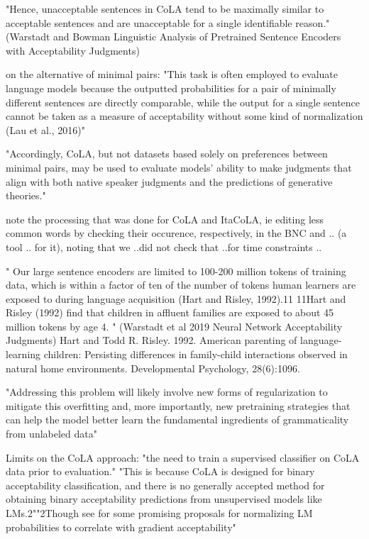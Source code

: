 "Hence, unacceptable sentences in CoLA tend to
be maximally similar to acceptable sentences and
are unacceptable for a single identifiable reason."   (Warstadt and Bowman Linguistic Analysis of Pretrained Sentence Encoders with Acceptability Judgments)

on the alternative of minimal pairs:
"This task is often employed
to evaluate language models because the outputted
probabilities for a pair of minimally different sentences are directly comparable, while the output
for a single sentence cannot be taken as a measure
of acceptability without some kind of normalization (Lau et al., 2016)"

"Accordingly, CoLA, but not datasets based
solely on preferences between minimal pairs, may
be used to evaluate models’ ability to make judgments that align with both native speaker judgments and the predictions of generative theories."

note the processing that was done for CoLA and ItaCoLA, ie editing less common words by checking their occurence, respectively, in the BNC and .. (a tool .. for it), noting that we ..did not check that ..for time constraints ..

" Our large sentence encoders are limited
to 100-200 million tokens of training data, which
is within a factor of ten of the number of tokens
human learners are exposed to during language
acquisition (Hart and Risley, 1992).11 
11Hart and Risley (1992) find that children in affluent families are exposed to about 45 million tokens by age 4.
" (Warstadt et al 2019 Neural Network Acceptability Judgments)
Hart and Todd R. Risley. 1992. American parenting of language-learning children: Persisting differences in family-child interactions observed in natural home environments. Developmental Psychology, 28(6):1096.


"Addressing this problem will likely involve new forms of regularization to mitigate this overfitting and, more importantly, new pretraining
strategies that can help the model better learn the fundamental ingredients of grammaticality from unlabeled data" 


Limits on the CoLA approach: "the need to train a supervised classifier on CoLA data prior to evaluation." \citep{warstadt2020blimp}	
"This is because CoLA is designed for binary acceptability classification, and there is no generally accepted method for obtaining binary acceptability predictions from unsupervised
models like LMs.2""2Though see \citet{lau2017grammaticality} for some promising proposals for normalizing LM probabilities to correlate with gradient acceptability" \citep{warstadt2020blimp}	

